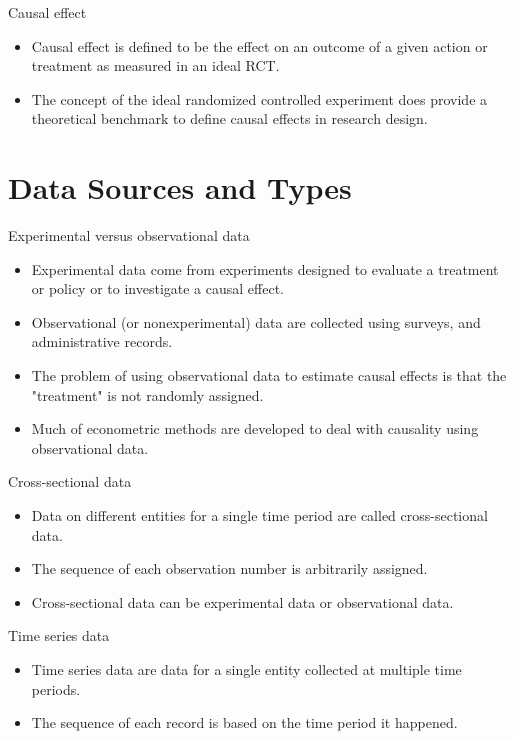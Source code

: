 \documentclass[presentation]{beamer}
\begin{document}
\begin{frame}[label={sec:org23efa67}]{Causal effect}
\begin{itemize}
\item \alert{Causal effect} is defined to be the effect on an outcome of a given
action or treatment as measured in an ideal RCT.
\item The concept of the ideal randomized controlled experiment does
provide a theoretical benchmark to define causal effects in research
design.
\end{itemize}
\end{frame}


\section{Data Sources and Types}
\label{sec:org9cf4a30}
\setcounter{tocdepth}{1}
\tableofcontents[currentsection]

\begin{frame}[label={sec:org7896b34}]{Experimental versus observational data}
\begin{itemize}
\item \alert{Experimental data} come from experiments designed to evaluate a
treatment or policy or to investigate a causal effect.
\item \alert{Observational (or nonexperimental) data} are collected using
surveys, and administrative records.
\item The problem of using observational data to estimate causal effects is
that the "treatment" is not randomly assigned.
\item Much of econometric methods are developed to deal with
causality using observational data.
\end{itemize}
\end{frame}


\begin{frame}[label={sec:org4a08e8d}]{Cross-sectional data}
\begin{itemize}
\item Data on different entities for a single time period are called
\alert{cross-sectional data}.
\item The sequence of each observation number is arbitrarily assigned.
\item Cross-sectional data can be experimental data or observational data.
\end{itemize}
\end{frame}


\begin{frame}[label={sec:org647b748}]{Time series data}
\begin{itemize}
\item Time series data are data for a single entity collected at multiple
time periods.
\item The sequence of each record is based on the time period
it happened.
\end{itemize}
\end{frame}
\end{document}
